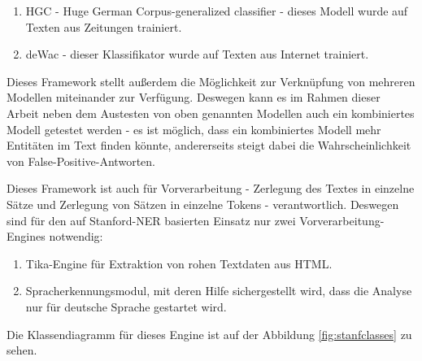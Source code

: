 \begin{enumerate}
\item HGC - Huge German Corpus-generalized classifier - dieses Modell wurde auf Texten aus Zeitungen trainiert.
\item deWac - dieser Klassifikator wurde auf Texten aus Internet trainiert.
\end{enumerate}

Dieses Framework stellt außerdem die Möglichkeit zur Verknüpfung von mehreren Modellen miteinander zur Verfügung. Deswegen kann es im Rahmen dieser Arbeit neben dem Austesten von oben genannten Modellen auch ein kombiniertes Modell getestet werden - es ist möglich, dass ein kombiniertes Modell mehr Entitäten im Text finden könnte, andererseits steigt dabei die Wahrscheinlichkeit von False-Positive-Antworten.

Dieses Framework ist auch für Vorverarbeitung - Zerlegung des Textes in einzelne Sätze und Zerlegung von Sätzen in einzelne Tokens - verantwortlich. Deswegen sind für den auf Stanford-NER basierten Einsatz nur zwei Vorverarbeitung-Engines notwendig:
\begin{enumerate}
\item Tika-Engine für Extraktion von rohen Textdaten aus HTML.
\item Spracherkennungsmodul, mit deren Hilfe sichergestellt wird, dass die Analyse nur für deutsche Sprache gestartet wird.
\end{enumerate}

Die Klassendiagramm für dieses Engine ist auf der Abbildung \ref{fig:stanfclasses} zu sehen.

